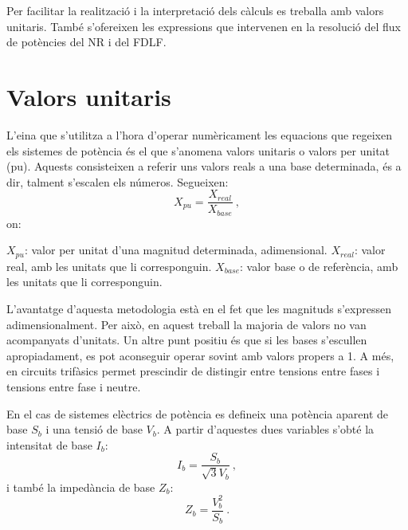 Per facilitar la realització i la interpretació dels càlculs es treballa amb valors unitaris. També s'ofereixen les expressions que intervenen en la resolució del flux de potències del NR i del FDLF. 

\section{Valors unitaris}
L'eina que s'utilitza a l'hora d'operar numèricament les equacions que regeixen els sistemes de potència és el que s'anomena valors unitaris o valors per unitat (pu). Aquests consisteixen a referir uns valors reals a una base determinada, és a dir, talment s'escalen els números. Segueixen:
\begin{equation}
    X_{pu} = \frac{X_{real}}{X_{base}}\ ,
    \label{eq:annex1}
\end{equation}
on:

$X_{pu}$: valor per unitat d'una magnitud determinada, adimensional.
\vs
$X_{real}$: valor real, amb les unitats que li corresponguin.
\vs
$X_{base}$: valor base o de referència, amb les unitats que li corresponguin.

L'avantatge d'aquesta metodologia està en el fet que les magnituds s'expressen adimensionalment. Per això, en aquest treball la majoria de valors no van acompanyats d'unitats. Un altre punt positiu és que si les bases s'escullen apropiadament, es pot aconseguir operar sovint amb valors propers a 1. A més, en circuits trifàsics permet prescindir de distingir entre tensions entre fases i tensions entre fase i neutre. 

En el cas de sistemes elèctrics de potència es defineix una potència aparent de base $S_b$ i una tensió de base $V_b$. A partir d'aquestes dues variables s'obté la intensitat de base $I_b$:
\begin{equation}
    I_{b} = \frac{S_b}{\sqrt{3}V_b}\ ,
    \label{eq:annex2}
\end{equation}
i també la impedància de base $Z_b$:
\begin{equation}
    Z_{b} = \frac{V^2_b}{S_b}\ .
    \label{eq:annex3}
\end{equation}

